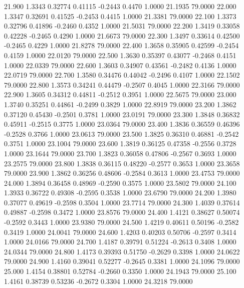   21.900   1.3343   0.32774   0.41115  -0.2443   0.4470   1.0000  21.1935  79.0000
  22.000   1.3347   0.32691   0.41525  -0.2453   0.4415   1.0000  21.3381  79.0000
  22.100   1.3373   0.32796   0.41896  -0.2460   0.4352   1.0000  21.5031  79.0000
  22.200   1.3419   0.33058   0.42228  -0.2465   0.4290   1.0000  21.6673  79.0000
  22.300   1.3497   0.33614   0.42500  -0.2465   0.4229   1.0000  21.8278  79.0000
  22.400   1.3658   0.35905   0.42599  -0.2454   0.4159   1.0000  22.0120  79.0000
  22.500   1.3630   0.35397   0.43077  -0.2468   0.4151   1.0000  22.0339  79.0000
  22.600   1.3603   0.34907   0.43561  -0.2482   0.4136   1.0000  22.0719  79.0000
  22.700   1.3580   0.34476   0.44042  -0.2496   0.4107   1.0000  22.1502  79.0000
  22.800   1.3573   0.34241   0.44479  -0.2507   0.4045   1.0000  22.3166  79.0000
  22.900   1.3605   0.34312   0.44811  -0.2512   0.3951   1.0000  22.5675  79.0000
  23.000   1.3740   0.35251   0.44861  -0.2499   0.3829   1.0000  22.8919  79.0000
  23.200   1.3862   0.37120   0.45430  -0.2501   0.3781   1.0000  23.0191  79.0000
  23.300   1.3848   0.36832   0.45911  -0.2515   0.3775   1.0000  23.0364  79.0000
  23.400   1.3836   0.36559   0.46396  -0.2528   0.3766   1.0000  23.0613  79.0000
  23.500   1.3825   0.36310   0.46881  -0.2542   0.3751   1.0000  23.1004  79.0000
  23.600   1.3819   0.36125   0.47358  -0.2556   0.3728   1.0000  23.1644  79.0000
  23.700   1.3823   0.36058   0.47806  -0.2567   0.3693   1.0000  23.2575  79.0000
  23.800   1.3838   0.36115   0.48220  -0.2577   0.3653   1.0000  23.3658  79.0000
  23.900   1.3862   0.36256   0.48606  -0.2584   0.3613   1.0000  23.4753  79.0000
  24.000   1.3894   0.36458   0.48969  -0.2590   0.3575   1.0000  23.5802  79.0000
  24.100   1.3933   0.36722   0.49308  -0.2595   0.3538   1.0000  23.6790  79.0000
  24.200   1.3980   0.37077   0.49619  -0.2598   0.3504   1.0000  23.7714  79.0000
  24.300   1.4039   0.37614   0.49887  -0.2598   0.3472   1.0000  23.8576  79.0000
  24.400   1.4121   0.38627   0.50074  -0.2592   0.3443   1.0000  23.9380  79.0000
  24.500   1.4219   0.40611   0.50196  -0.2582   0.3419   1.0000  24.0041  79.0000
  24.600   1.4203   0.40203   0.50706  -0.2597   0.3414   1.0000  24.0166  79.0000
  24.700   1.4187   0.39791   0.51224  -0.2613   0.3408   1.0000  24.0344  79.0000
  24.800   1.4173   0.39393   0.51750  -0.2629   0.3398   1.0000  24.0622  79.0000
  24.900   1.4160   0.39041   0.52277  -0.2645   0.3381   1.0000  24.1096  79.0000
  25.000   1.4154   0.38801   0.52784  -0.2660   0.3350   1.0000  24.1943  79.0000
  25.100   1.4161   0.38739   0.53236  -0.2672   0.3304   1.0000  24.3218  79.0000
